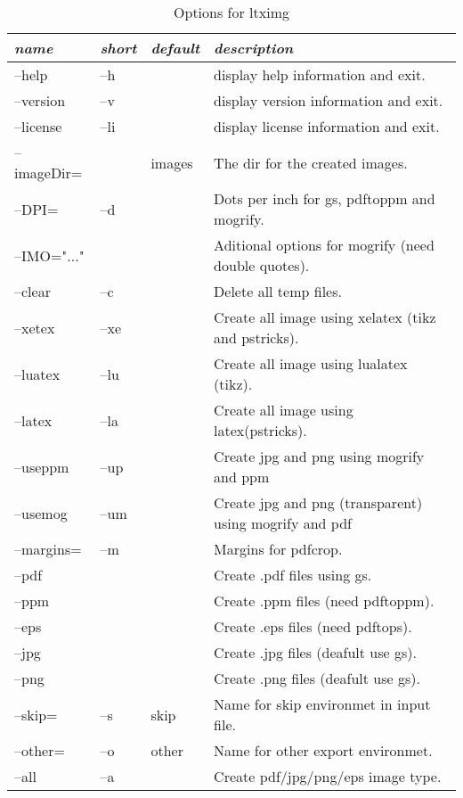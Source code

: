 \documentclass[11pt]{article}
\begin{document}
\begin{table}[htp]
\caption{Options for ltximg}
\begin{tabularx}{\linewidth}{@{}>{\ttfamily} l>{\ttfamily} l >{\ttfamily}l X @{}}\\\toprule
\emph{name} & \emph{short} & \emph{default} & \emph{description}\\\midrule
--help      &  --h         &                & display help information and exit.\\
--version   &  --v         &      			  & display version information and exit.\\
--license   &  --li        &			      & display license information and exit.\\
--imageDir= &              &       images    & The dir for the created images.\\
--DPI=      &  --d         &  300            & Dots per inch for gs, pdftoppm and mogrify.\\
--IMO="..." &              &                 & Aditional options for mogrify (need double quotes).\\
--clear     &  --c       	&				  & Delete all temp files.\\
--xetex     & --xe			&				  & Create all image using xelatex (tikz and pstricks).\\
--luatex    & --lu			&				  & Create all image using lualatex (tikz).\\
--latex     & --la			&				  & Create all image using latex(pstricks).\\
--useppm    & --up			&				  & Create jpg and png using mogrify and ppm\\
--usemog    & --um			&				  & Create jpg and png (transparent) using mogrify and pdf\\
--margins=  & --m			& 0				  & Margins for pdfcrop.\\
--pdf       &    			&				  & Create .pdf files using gs.\\
--ppm       &    			&				  & Create .ppm files (need pdftoppm).\\
--eps       &    			&				  & Create .eps files (need pdftops).\\
--jpg       &    			&				  & Create .jpg files (deafult use gs).\\
--png       &    			&				  & Create .png files (deafult use gs).\\
--skip=     & --s			& skip			  & Name for skip environmet in input file.\\
--other=    & --o   		& other			  & Name for other export environmet.\\
--all	    & --a			&				  & Create pdf/jpg/png/eps image type.\\
\bottomrule
\end{tabularx}
\end{table}
\end{document}
